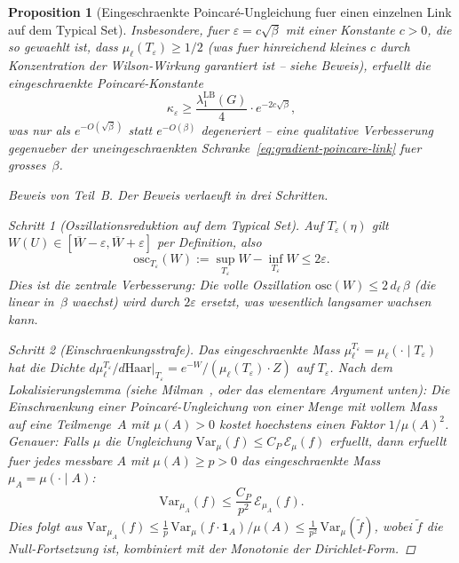 \documentclass[12pt,a4paper]{article}
\theoremstyle{definition}
\theoremstyle{plain}
\newtheorem{proposition}[definition]{Proposition}
\theoremstyle{remark}
\begin{document}
\begin{proposition}[Eingeschraenkte Poincar\'e-Ungleichung fuer einen einzelnen Link auf dem Typical Set]
Insbesondere, fuer $\varepsilon = c\sqrt{\beta}$ mit einer Konstante $c > 0$, die so gewaehlt ist, dass $\mu_\ell(T_\varepsilon) \geq 1/2$ (was fuer hinreichend kleines $c$ durch Konzentration der Wilson-Wirkung garantiert ist -- siehe Beweis), erfuellt die eingeschraenkte Poincar\'e-Konstante
\begin{equation}\label{eq:restricted-constant-explicit}
    \kappa_\varepsilon \geq \frac{\lambda_1^{\mathrm{LB}}(G)}{4}\cdot e^{-2c\sqrt{\beta}},
\end{equation}
was nur als $e^{-O(\sqrt{\beta})}$ statt $e^{-O(\beta)}$ degeneriert -- eine qualitative Verbesserung gegenueber der uneingeschraenkten Schranke~\eqref{eq:gradient-poincare-link} fuer grosses~$\beta$.

\begin{proof}[Beweis von Teil~B]
Der Beweis verlaeuft in drei Schritten.

\emph{Schritt 1 (Oszillationsreduktion auf dem Typical Set).}
Auf $T_\varepsilon(\eta)$ gilt $W(U) \in [\overline{W} - \varepsilon, \overline{W} + \varepsilon]$ per Definition, also
\[
    \mathrm{osc}_{T_\varepsilon}(W) := \sup_{T_\varepsilon} W - \inf_{T_\varepsilon} W \leq 2\varepsilon.
\]
Dies ist die zentrale Verbesserung: Die volle Oszillation $\mathrm{osc}(W) \leq 2\,d_\ell\,\beta$ (die linear in~$\beta$ waechst) wird durch $2\varepsilon$ ersetzt, was wesentlich langsamer wachsen kann.

\emph{Schritt 2 (Einschraenkungsstrafe).}
Das eingeschraenkte Mass $\mu_\ell^{T_\varepsilon} = \mu_\ell(\cdot \mid T_\varepsilon)$ hat die Dichte $d\mu_\ell^{T_\varepsilon}/d\mathrm{Haar}|_{T_\varepsilon} = e^{-W}/(\mu_\ell(T_\varepsilon) \cdot Z)$ auf $T_\varepsilon$. Nach dem Lokalisierungslemma (siehe Milman~\cite{Milman2009}, oder das elementare Argument unten): Die Einschraenkung einer Poincar\'e-Ungleichung von einer Menge mit vollem Mass auf eine Teilmenge~$A$ mit $\mu(A) > 0$ kostet hoechstens einen Faktor $1/\mu(A)^2$. Genauer: Falls $\mu$ die Ungleichung $\mathrm{Var}_\mu(f) \leq C_P\,\mathcal{E}_\mu(f)$ erfuellt, dann erfuellt fuer jedes messbare $A$ mit $\mu(A) \geq p > 0$ das eingeschraenkte Mass $\mu_A = \mu(\cdot \mid A)$:
\[
    \mathrm{Var}_{\mu_A}(f) \leq \frac{C_P}{p^2}\,\mathcal{E}_{\mu_A}(f).
\]
Dies folgt aus $\mathrm{Var}_{\mu_A}(f) \leq \frac{1}{p}\,\mathrm{Var}_\mu(f\cdot\mathbf{1}_A)/\mu(A) \leq \frac{1}{p^2}\,\mathrm{Var}_\mu(\tilde{f})$, wobei $\tilde{f}$ die Null-Fortsetzung ist, kombiniert mit der Monotonie der Dirichlet-Form.


\end{proof}
\end{proposition}
\end{document}
